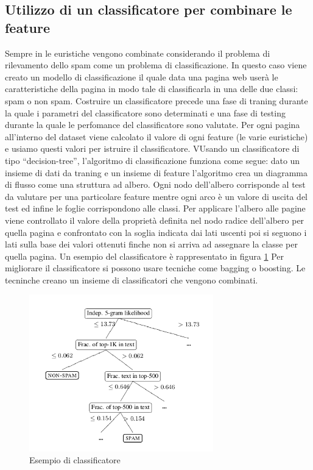 \subsection{Utilizzo di un classificatore per combinare le feature}
Sempre in \cite{Ntoulas:2006:DSW:1135777.1135794} le euristiche vengono combinate considerando il problema di rilevamento dello spam come un problema di classificazione. In questo caso  viene creato un modello di classificazione il quale data una pagina web userà le caratteristiche della pagina in modo tale di classificarla in una delle due classi: spam o non spam. Costruire un classificatore precede una fase di traning durante la quale i parametri del classificatore sono determinati e una fase di testing durante la quale le perfomance del classificatore sono valutate. Per ogni pagina all'interno del dataset viene calcolato il valore di ogni feature (le varie euristiche) e usiamo questi valori per istruire il classificatore. VUsando  un classificatore di tipo ``decision-tree'', l'algoritmo di classificazione funziona come segue: dato un insieme di dati da traning e un insieme di feature l'algoritmo crea un diagramma di flusso come una struttura ad albero. Ogni nodo dell'albero corrisponde al test da valutare 
per una particolare feature mentre ogni arco è un valore di uscita del test ed infine le foglie corrispondono alle classi.  Per applicare l'albero alle pagine viene controllato il valore della proprietà  definita nel nodo radice dell'albero per quella pagina e confrontato con la soglia indicata dai lati uscenti poi si seguono i lati sulla base dei valori ottenuti finche non si arriva ad assegnare la classe per quella pagina. Un esempio del classificatore è rappresentato in figura \ref{fig:fetterly13} Per migliorare il classificatore si possono usare tecniche come bagging o boosting. Le tecninche creano un insieme di classificatori  che vengono combinati.
\begin{figure}[htbp]
\centering
\includegraphics[width=8cm]{immagini/fetterly/fetterly13}
\caption{Esempio di classificatore}
\label{fig:fetterly13}
\end{figure}

